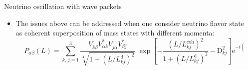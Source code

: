 \documentclass[usenames, dvipsnames]{beamer}
\begin{document}
\begin{frame}[fragile]
\begin{columns}[T]
\begin{column}{.5\textwidth}
\begin{block}{Neutrino oscillation with wave packets}
  \begin{itemize}
      \item The issues above can be addressed when one consider neutrino
          flavor state as coherent superposition of mass states with different
          momenta:
        \begin{equation*}
\quad\, P_{\alpha\beta}(L)  =\sum_{k,\,j=1}^3\frac{ V^{\phantom\dagger}_{k \beta }V^*_{\alpha k}V^{\phantom\dagger}_{j \alpha }  V^*_{\beta j} }{\sqrt[4]{1 +
    \left(L/L^{\text{d}}_{kj}\right)^2}}\,\,
    \exp{\left[- \frac{\left(L/L^\text{coh}_{kj}\right)^2}{1+\left(L/L^{\text{d}}_{kj}\right)^2} -\mathrm{D}^2_{kj}\right]}
    \text{e}^{-i(\varphi_{kj} + \varphi^d_{kj})},
\label{eq:ossc}
\end{equation*}
  \end{itemize}
\end{block}


\end{column}

\begin{column}{.5\textwidth}
\end{column}
\end{columns}

\end{frame}
\end{document}
